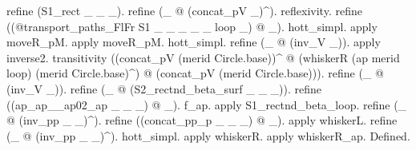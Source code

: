 \begin{coqdoccode}
\begin{coqdoccomment}
\begin{coqdoccomment}
\end{coqdoccomment}
\coqdoceol
\coqdocindent{1.00em}
refine\coqdocindent{0.50em}
(S1\_rect\coqdocindent{0.50em}
\_\coqdocindent{0.50em}
\_\coqdocindent{0.50em}
\_).\coqdoceol
\coqdocindent{1.00em}
refine\coqdocindent{0.50em}
(\_\coqdocindent{0.50em}
@\coqdocindent{0.50em}
(concat\_pV\coqdocindent{0.50em}
\_)\^{}).\coqdocindent{0.50em}
reflexivity.\coqdoceol
\coqdocindent{1.00em}
refine\coqdocindent{0.50em}
((@transport\_paths\_FlFr\coqdocindent{0.50em}
S1\coqdocindent{0.50em}
\_\coqdocindent{0.50em}
\_\coqdocindent{0.50em}
\_\coqdocindent{0.50em}
\_\coqdocindent{0.50em}
\_\coqdocindent{0.50em}
loop\coqdocindent{0.50em}
\_)\coqdocindent{0.50em}
@\coqdocindent{0.50em}
\_).\coqdoceol
\coqdocindent{1.00em}
hott\_simpl.\coqdocindent{0.50em}
\coqdoceol
\coqdocindent{1.00em}
apply\coqdocindent{0.50em}
moveR\_pM.\coqdocindent{0.50em}
apply\coqdocindent{0.50em}
moveR\_pM.\coqdocindent{0.50em}
hott\_simpl.\coqdocindent{0.50em}
refine\coqdocindent{0.50em}
(\_\coqdocindent{0.50em}
@\coqdocindent{0.50em}
(inv\_V\coqdocindent{0.50em}
\_)).\coqdocindent{0.50em}
\coqdoceol
\coqdocindent{1.00em}
apply\coqdocindent{0.50em}
inverse2.\coqdoceol
\coqdocindent{1.00em}
transitivity\coqdocindent{0.50em}
((concat\_pV\coqdocindent{0.50em}
(merid\coqdocindent{0.50em}
Circle.base))\^{}\coqdoceol
\coqdocindent{8.00em}
@\coqdocindent{0.50em}
(whiskerR\coqdocindent{0.50em}
(ap\coqdocindent{0.50em}
merid\coqdocindent{0.50em}
loop)\coqdocindent{0.50em}
(merid\coqdocindent{0.50em}
Circle.base)\^{})\coqdoceol
\coqdocindent{8.00em}
@\coqdocindent{0.50em}
(concat\_pV\coqdocindent{0.50em}
(merid\coqdocindent{0.50em}
Circle.base))).\coqdoceol
\coqdocindent{1.00em}
refine\coqdocindent{0.50em}
(\_\coqdocindent{0.50em}
@\coqdocindent{0.50em}
(inv\_V\coqdocindent{0.50em}
\_)).\coqdoceol
\coqdocindent{1.00em}
refine\coqdocindent{0.50em}
(\_\coqdocindent{0.50em}
@\coqdocindent{0.50em}
(S2\_rectnd\_beta\_surf\coqdocindent{0.50em}
\_\coqdocindent{0.50em}
\_\coqdocindent{0.50em}
\_)).\coqdoceol
\coqdocindent{1.00em}
refine\coqdocindent{0.50em}
((ap\_ap\_\_ap02\_ap\coqdocindent{0.50em}
\_\coqdocindent{0.50em}
\_\coqdocindent{0.50em}
\_)\coqdocindent{0.50em}
@\coqdocindent{0.50em}
\_).\coqdoceol
\coqdocindent{1.00em}
f\_ap.\coqdocindent{0.50em}
apply\coqdocindent{0.50em}
S1\_rectnd\_beta\_loop.\coqdoceol
\coqdocindent{1.00em}
refine\coqdocindent{0.50em}
(\_\coqdocindent{0.50em}
@\coqdocindent{0.50em}
(inv\_pp\coqdocindent{0.50em}
\_\coqdocindent{0.50em}
\_)\^{}).\coqdocindent{0.50em}
refine\coqdocindent{0.50em}
((concat\_pp\_p\coqdocindent{0.50em}
\_\coqdocindent{0.50em}
\_\coqdocindent{0.50em}
\_)\coqdocindent{0.50em}
@\coqdocindent{0.50em}
\_).\coqdocindent{0.50em}
apply\coqdocindent{0.50em}
whiskerL.\coqdoceol
\coqdocindent{1.00em}
refine\coqdocindent{0.50em}
(\_\coqdocindent{0.50em}
@\coqdocindent{0.50em}
(inv\_pp\coqdocindent{0.50em}
\_\coqdocindent{0.50em}
\_)\^{}).\coqdocindent{0.50em}
hott\_simpl.\coqdocindent{0.50em}
apply\coqdocindent{0.50em}
whiskerR.\coqdoceol
\coqdocindent{1.00em}
apply\coqdocindent{0.50em}
whiskerR\_ap.\coqdoceol
Defined.\coqdoceol
\end{coqdoccomment}
\coqdoceol
\coqdocemptyline
\end{coqdoccode}
